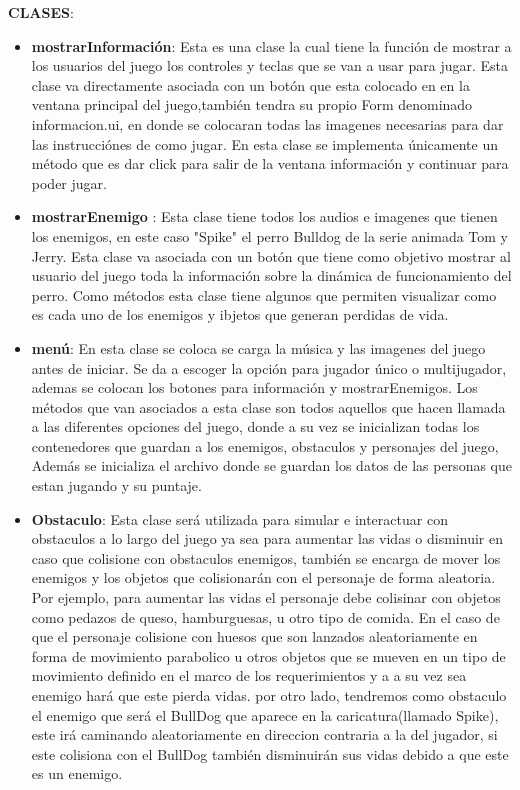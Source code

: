 \documentclass{article}
\begin{document}
\noindent\textbf{CLASES}:\
\begin{itemize}

\item\noindent\textbf{mostrarInformación}: 
Esta es una clase la cual  tiene la función de mostrar a los usuarios del juego los controles y teclas que se van a usar para jugar. Esta clase va directamente asociada con un botón que esta colocado en en la ventana principal del juego,también tendra su propio Form denominado informacion.ui, en donde se colocaran todas las imagenes necesarias para dar las instrucciónes de como jugar. En esta clase se implementa únicamente un método que es dar click para salir de la ventana información y continuar para poder jugar.\\ 


\item\noindent\textbf{mostrarEnemigo} : 
Esta clase tiene todos los audios e imagenes que tienen los enemigos, en este caso "Spike" el perro Bulldog de la serie animada Tom y Jerry. Esta clase va asociada con un botón que tiene como objetivo mostrar al usuario del juego toda la información sobre la dinámica de funcionamiento del perro. Como métodos esta clase tiene algunos que permiten  visualizar como es cada uno de los enemigos y ibjetos que generan perdidas de vida.\\

\item\noindent\textbf{menú}: 
En esta clase se coloca se carga la música y las imagenes del juego antes de iniciar. Se da a escoger la opción para jugador único o multijugador, ademas se colocan los botones para información y mostrarEnemigos. Los métodos que van asociados a esta clase son todos aquellos que hacen llamada a las diferentes opciones del juego, donde a su vez se inicializan todas los contenedores que guardan a los enemigos, obstaculos y personajes del juego, Además se inicializa el archivo donde se guardan los datos de las personas que estan jugando y su puntaje.\\
 
\item\noindent\textbf{Obstaculo}: 
Esta clase será utilizada para simular e interactuar con obstaculos a lo largo del juego ya sea para aumentar las vidas o disminuir en caso que colisione con obstaculos enemigos, también se encarga de mover los enemigos y los objetos que colisionarán con el personaje de forma aleatoria. 
Por ejemplo, para aumentar las vidas el personaje debe colisinar con objetos como pedazos de queso, hamburguesas, u otro tipo de comida.
En el caso de que el personaje colisione con huesos que son lanzados aleatoriamente en forma de movimiento parabolico u otros objetos que se mueven en un tipo de movimiento definido en el marco de los requerimientos y a a su vez sea enemigo hará que este pierda vidas.
por otro lado,  tendremos como obstaculo el enemigo que será el BullDog que aparece en la caricatura(llamado Spike), este irá caminando aleatoriamente en direccion contraria a la del jugador, si este colisiona con el BullDog también disminuirán sus vidas debido a que este es un enemigo.\\
 

\end{itemize}
\end{document}
